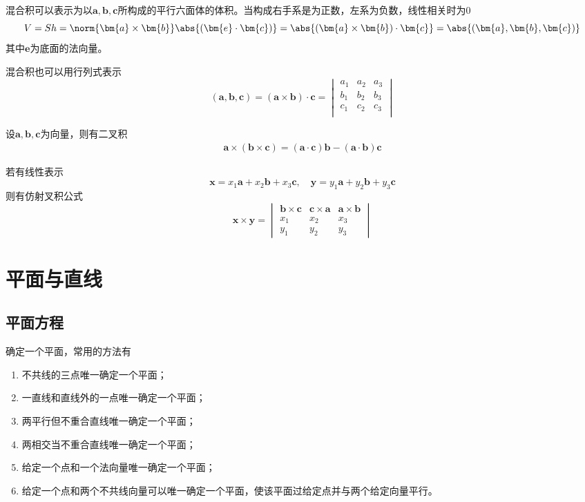 混合积可以表示为以$\bm{a},\bm{b},\bm{c}$所构成的平行六面体的体积。当构成右手系是为正数，左系为负数，线性相关时为$0$
\begin{equation}
    V = Sh = \norm{\bm{a}\times\bm{b}} \abs{(\bm{e}\cdot\bm{c})} = \abs{(\bm{a}\times\bm{b})\cdot\bm{c}} = \abs{(\bm{a},\bm{b},\bm{c})}
\end{equation}
其中$\bm{e}$为底面的法向量。

混合积也可以用行列式表示
\begin{equation}
    (\bm{a},\bm{b},\bm{c}) = (\bm{a}\times\bm{b})\cdot\bm{c}
    =
    \begin{vmatrix}
        a_1 & a_2 & a_3 \\
        b_1 & b_2 & b_3 \\
        c_1 & c_2 & c_3 \\
    \end{vmatrix}
\end{equation}

设$\bm{a},\bm{b},\bm{c}$为向量，则有二叉积
\begin{eqnarray}
    \label{eq:二叉积}
    \bm{a}\times(\bm{b}\times\bm{c}) = (\bm{a}\cdot\bm{c})\bm{b} - (\bm{a}\cdot\bm{b})\bm{c}
\end{eqnarray}

若有线性表示
\[ \bm{x} = x_1\bm{a} + x_2\bm{b} + x_3\bm{c}, \quad \bm{y} = y_1\bm{a} + y_2\bm{b} + y_3\bm{c} \]
则有仿射叉积公式
\begin{equation}
    \bm{x}\times\bm{y}=
    \begin{vmatrix}
        \bm{b}\times\bm{c} & \bm{c}\times\bm{a} & \bm{a}\times\bm{b} \\
        x_1                & x_2                & x_3                \\
        y_1                & y_2                & y_3
    \end{vmatrix}
\end{equation}

\section{平面与直线}
\subsection{平面方程}
确定一个平面，常用的方法有
\begin{enumerate}[(1)]
    \item 不共线的三点唯一确定一个平面；
    \item 一直线和直线外的一点唯一确定一个平面；
    \item 两平行但不重合直线唯一确定一个平面；
    \item 两相交当不重合直线唯一确定一个平面；
    \item 给定一个点和一个法向量唯一确定一个平面；
    \item 给定一个点和两个不共线向量可以唯一确定一个平面，使该平面过给定点并与两个给定向量平行。
\end{enumerate}

